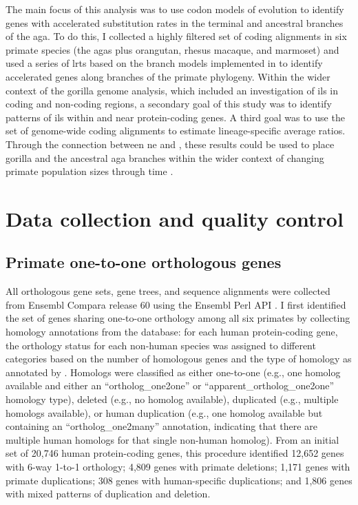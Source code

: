 The main focus of this analysis was to use codon models of evolution
to identify genes with accelerated \nsyn substitution rates in the
terminal and ancestral branches of the \ac{aga}. To do this, I
collected a highly filtered set of coding alignments in six primate
species (the \acp{aga} plus orangutan, rhesus macaque, and
marmoset) and used a series of \acp{lrt} based on the branch models
implemented in  to identify accelerated genes along branches
of the primate phylogeny. Within the wider context of the gorilla
genome analysis, which included an investigation of \ac{ils} in coding
and non-coding regions, a secondary goal of this study was to identify
patterns of \ac{ils} within and near protein-coding genes. A third
goal was to use the set of genome-wide coding alignments to estimate
lineage-specific average \dnds ratios. Through the connection between
\ac{ne} and \dnds, these results could be used to place gorilla and
the ancestral \ac{aga} branches within the wider context of changing
primate population sizes through time \citep{Sequencing2005a}.

\section{Data collection and quality control}
\subsection{Primate one-to-one orthologous genes}

All orthologous gene sets, gene trees, and sequence alignments were
collected from Ensembl Compara release 60 using the Ensembl Perl API
\citep{Vilella2009,Flicek2011}. I first identified the set of genes
sharing one-to-one orthology among all six primates by collecting
homology annotations from the \ens \cmp database: for each human
protein-coding gene, the orthology status for each non-human species
was assigned to different categories based on the number of homologous
genes and the type of homology as annotated by \ens. Homologs were
classified as either one-to-one (e.g., one homolog available and
either an ``ortholog\_one2one'' or ``apparent\_ortholog\_one2one''
homology type), deleted (e.g., no homolog available), duplicated
(e.g., multiple homologs available), or human duplication (e.g., one
homolog available but containing an ``ortholog\_one2many'' annotation,
indicating that there are multiple human homologs for that single
non-human homolog). From an initial set of 20,746 human protein-coding
genes, this procedure identified 12,652 genes with 6-way 1-to-1
orthology; 4,809 genes with primate deletions; 1,171 genes with
primate duplications; 308 genes with human-specific duplications; and
1,806 genes with mixed patterns of duplication and deletion.

